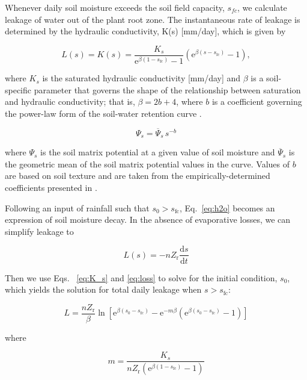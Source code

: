 Whenever daily soil moisture exceeds the soil field capacity, $s_{fc}$, we calculate leakage of water out of the plant root zone. The instantaneous rate of leakage is determined by the hydraulic conductivity, K(s) [mm/day], which is given by

\begin{equation}
\label{eq:K_s}
    L(s) = K(s) = \frac{K_s} {\mathrm{e}^{\beta(1-s_{\text{fc}})}-1} (\mathrm{e}^{\beta(s-s_{\text{fc}})}-1),
\end{equation}

\noindent
where $K_s$ is the saturated hydraulic conductivity [mm/day] and $\beta$ is a soil-specific parameter that governs the shape of the relationship between saturation and hydraulic conductivity; that is, $\beta = 2b + 4$, where $b$ is a  coefficient governing the power-law form of the soil-water retention curve \cite{Laio2001-fe}. 

\begin{equation}
    \varPsi_s = \overline{\varPsi}_s \, s^{-b}
\end{equation}

\noindent
where $\varPsi_s$ is the soil matrix potential at a given value of soil moisture and $\overline{\varPsi}_s$ is the geometric mean of the soil matrix potential values in the curve. Values of $b$ are based on soil texture and are taken from the empirically-determined coefficients presented in . 

Following an input of rainfall such that $s_0 >  s_{\text{fc}}$, Eq.~\ref{eq:h2o} becomes an expression of soil moisture decay. In the absence of evaporative losses, we can simplify leakage to

\begin{equation}
\label{eq:loss}
    L(s) = - n Z_{\text{r}} \frac{\text{d}s} {\text{d}t} 
\end{equation}

Then we use Eqs.~ \ref{eq:K_s} and \ref{eq:loss} to solve for the initial condition, $s_0$, which yields the solution for total daily leakage when $s >  s_{\text{fc}}$: 

\begin{equation}
\label{eq:L}
    L= \frac{n Z_{\text{r}}}{\beta} \ln{\left[ \mathrm{e}^{\beta (s_0 - s_{\text{fc}})} - \mathrm{e}^{-m \beta} (\mathrm{e}^{\beta (s_0 - s_{\text{fc}})} - 1 ) \right] }
\end{equation}

where 

\begin{equation}
\label{eq:m}
    m = \frac{K_s}{n Z_{\text{r}} \left( \mathrm{e}^{\beta (1 - s_{\text{fc}})} - 1 \right)}
\end{equation}


